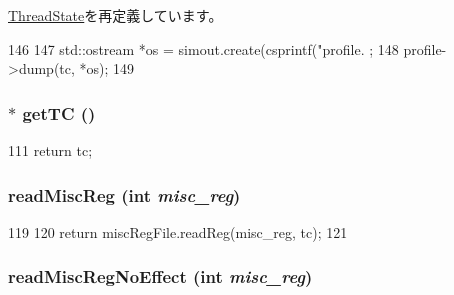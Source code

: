 \hyperlink{structThreadState_a13fa12d1779a94a1e0b968946a1367c7}{ThreadState}を再定義しています。


\begin{DoxyCode}
146     {
147         std::ostream *os = simout.create(csprintf("profile.%
      ;
148         profile->dump(tc, *os);
149     }
\end{DoxyCode}
\hypertarget{structOzoneThreadState_a81894d15db5190d5364449a4915b76f5}{
\subsubsection[{getTC}]{$\ast$ getTC ()}}
\label{structOzoneThreadState_a81894d15db5190d5364449a4915b76f5}



\begin{DoxyCode}
111 { return tc; }
\end{DoxyCode}
\hypertarget{structOzoneThreadState_a5a8c6c487e8da143d26188258b04f1cc}{
\subsubsection[{readMiscReg}]{ readMiscReg (int {\em misc\_\-reg})}}
\label{structOzoneThreadState_a5a8c6c487e8da143d26188258b04f1cc}



\begin{DoxyCode}
119     {
120         return miscRegFile.readReg(misc_reg, tc);
121     }
\end{DoxyCode}
\hypertarget{structOzoneThreadState_a7b5ac6af9c2c19d7c1b442b8a3aebbc6}{
\subsubsection[{readMiscRegNoEffect}]{ readMiscRegNoEffect (int {\em misc\_\-reg})}}
\label{structOzoneThreadState_a7b5ac6af9c2c19d7c1b442b8a3aebbc6}



